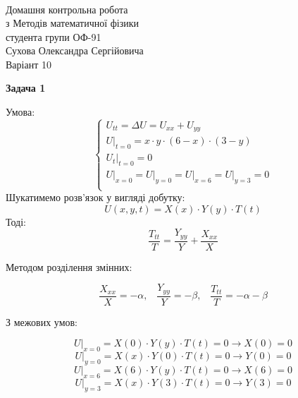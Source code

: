 \documentclass[]{article}
\begin{document}
$\;$

$\;$

$\;$

$\;$

$\;$

$\;$

$\;$

$\;$

$\;$

$\;$

$\;$

$\;$

$\;$

$\;$

$\;$

$\;$
\begin{center}
    \begin{huge}
    Домашня контрольна робота\\
    з Методів математичної фізики\\ 
    студента групи ОФ-91\\
    Сухова Олександра Сергійовича\\
    Варіант 10\\
    \end{huge}
\end{center}

\newpage

\begin{center}
    \textbf{Задача 1}
\end{center}
Умова:
\begin{equation*}
    \begin{cases}
      U_{tt}=\Delta U = U_{xx}+U_{yy}\\
      U\rvert_{t=0} = x\cdot y\cdot(6-x)\cdot(3-y)\\
      U_t\rvert_{t=0} = 0\\
      U\rvert_{x=0}= U\rvert_{y=0}=U\rvert_{x=6}=U\rvert_{y=3}=0\\
    \end{cases}
\end{equation*}
Шукатимемо розв'язок у вигляді добутку:
\[U(x,y,t) = X(x)\cdot Y(y)\cdot T(t)\]
Тоді:
\[\frac{T_{tt}}{T}=\frac{Y_{yy}}{Y}+\frac{X_{xx}}{X}\]

Методом розділення змінних:

\[\frac{X_{xx}}{X}=-\alpha,\;\;\;\frac{Y_{yy}}{Y}=-\beta,\;\;\; \frac{T_{tt}}{T}=-\alpha-\beta\]

З межових умов:

\[U\rvert_{x=0}=X(0)\cdot Y(y) \cdot T(t) = 0 \rightarrow X(0)=0\]
\[U\rvert_{y=0}=X(x)\cdot Y(0) \cdot T(t) = 0 \rightarrow Y(0)=0\]
\[U\rvert_{x=6}=X(6)\cdot Y(y) \cdot T(t) = 0 \rightarrow X(6)=0\]
\[U\rvert_{y=3}=X(x)\cdot Y(3) \cdot T(t) = 0 \rightarrow Y(3)=0\]
\end{document}
